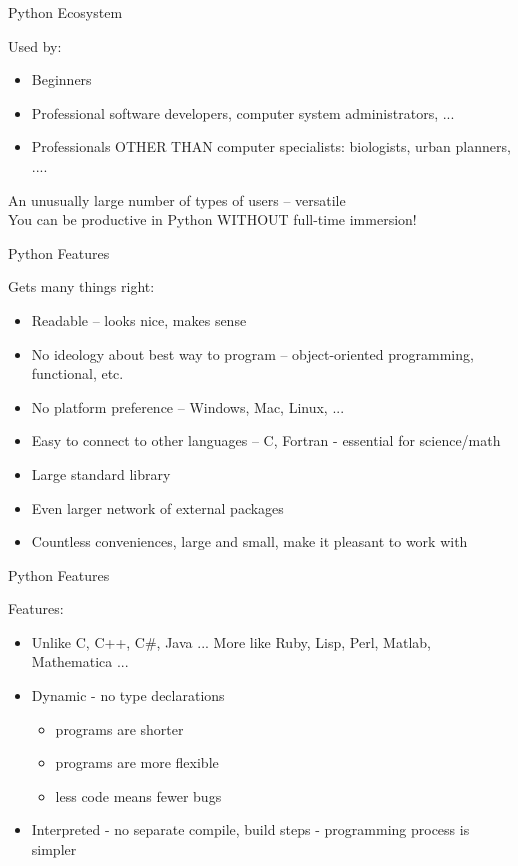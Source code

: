 \documentclass{beamer}
\begin{document}
\begin{frame}{Python Ecosystem}

{\Large Used by:} 
\begin{itemize}
  \item Beginners
  \item Professional software developers, computer system administrators, ...  
  \item Professionals OTHER THAN computer specialists: biologists, urban planners, ....
\end{itemize}
\vspace{0.25in}
 An unusually large number of types of users -- versatile\\[0.25in]
 You can be productive in Python WITHOUT full-time immersion!
\end{frame}


\begin{frame}{Python Features}
 
{\Large Gets many things right:}
\begin{itemize}
  \item  Readable -- looks nice, makes sense
  \item  No ideology about best way to program -- 
   object-oriented programming,  functional, etc.
  \item  No platform preference -- Windows, Mac, Linux, ...
  \item  Easy to connect to other languages -- C, Fortran - essential for science/math
  \item  Large standard library 
  \item  Even larger network of external packages
  \item  Countless conveniences, large and small, make it pleasant to work with
\end{itemize}
\end{frame}

\begin{frame}{Python Features}

{\Large Features:}

\begin{itemize}
  \item  Unlike C, C++, C\#, Java ... More like Ruby, Lisp, Perl, Matlab, Mathematica ...
  \item  Dynamic - no type declarations
    \begin{itemize}
      \item programs are shorter
      \item programs are more flexible
      \item less code means fewer bugs
    \end{itemize}
  \item  Interpreted - no separate compile, build steps - programming process is simpler
\end{itemize}

\end{frame}
\end{document}
